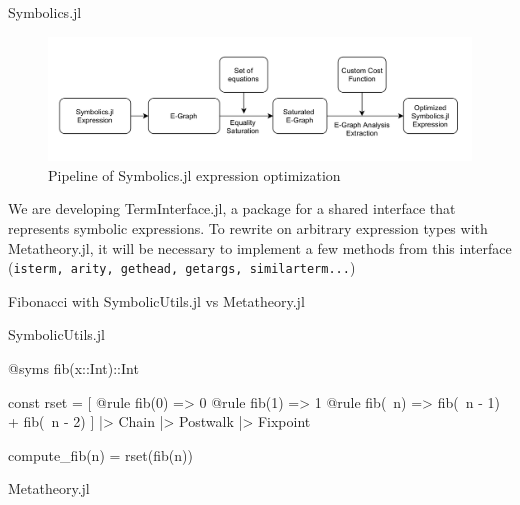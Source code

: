 \documentclass[8pt]{beamer}  %
\begin{document}
\begin{frame}{Symbolics.jl}
    
\begin{figure}
    \centering
    \includegraphics[width=\textwidth]{Symbolics.png}
    \caption{Pipeline of Symbolics.jl expression optimization}
    \label{fig:my_label}
\end{figure}

We are developing TermInterface.jl, a package for a shared interface that represents
symbolic expressions. To rewrite on arbitrary expression types with Metatheory.jl, it will be necessary 
to implement a few methods from this interface (\texttt{isterm, arity, gethead, getargs, similarterm...})

\end{frame}



\begin{frame}[fragile]{Fibonacci with SymbolicUtils.jl vs Metatheory.jl}

SymbolicUtils.jl \vspace{-0.4cm}
\begin{jllisting}
@syms fib(x::Int)::Int

const rset = [
    @rule fib(0) => 0
    @rule fib(1) => 1
    @rule fib(~n) => fib(~n - 1) + fib(~n - 2)
] |> Chain |> Postwalk |> Fixpoint

compute_fib(n) = rset(fib(n))
\end{jllisting}
Metatheory.jl \vspace{-0.4cm}

\end{frame}
 
\end{document}
